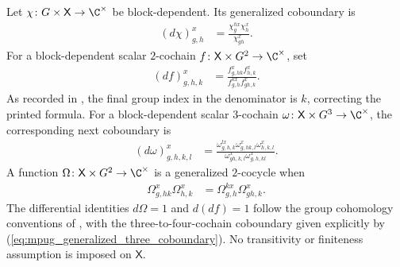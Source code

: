 \begin{definition}
    \label{def:mpug_generalized_cocycle}
    \leanok
    Let $\chi\colon G\times\mathsf X\to\C^\times$ be block-dependent. Its
    generalized coboundary is
    \begin{align}
        (d\chi)^x_{g,h}
         & =\frac{\chi^{h x}_g\chi^x_h}{\chi^x_{gh}}.
        \label{eq:mpug_generalized_coboundary}
    \end{align}
    For a block-dependent scalar $2$-cochain
    $f\colon\mathsf X\times G^2\to\C^\times$, set
    \begin{align}
        (df)^x_{g,h,k}
         & =\frac{f^x_{g,hk}f^x_{h,k}}
        {f^{k x}_{g,h}f^x_{gh,k}}.
        \label{eq:mpug_generalized_two_coboundary}
    \end{align}
    As recorded in \cite{gap:fbc25_two_cochain_coboundary_index_typo}, the
    final group index in the denominator is $k$, correcting the printed
    formula. For a block-dependent scalar $3$-cochain
    $\omega\colon\mathsf X\times G^3\to\C^\times$, the corresponding next
    coboundary is
    \begin{align}
        (d\omega)^x_{g,h,k,l}
         & =\frac{\omega^{l x}_{g,h,k}\omega^x_{g,hk,l}
            \omega^x_{h,k,l}}
        {\omega^x_{gh,k,l}\omega^x_{g,h,kl}}.
        \label{eq:mpug_generalized_three_coboundary}
    \end{align}
    A function $\Omega\colon\mathsf X\times G^2\to\C^\times$ is a
    generalized $2$-cocycle when
    \begin{align}
        \Omega^x_{g,hk}\Omega^x_{h,k}
         & =\Omega^{k x}_{g,h}\Omega^x_{gh,k}.
        \label{eq:mpug_generalized_cocycle}
    \end{align}
    The differential identities $d\Omega=1$ and $d(df)=1$ follow the group
    cohomology conventions of
    \cite[lines~5914--5922]{FrancoRubio2025MPUGauging}, with the
    three-to-four-cochain coboundary given explicitly by
    (\ref{eq:mpug_generalized_three_coboundary}).
    No transitivity or finiteness assumption is imposed on $\mathsf X$.

\end{definition}

